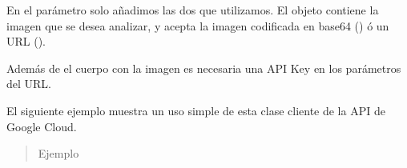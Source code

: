 \begin{fulllineitems}
\begin{fulllineitems}
\begin{sphinxVerbatim}[commandchars=\\\{\}]
   \PYG{p}{[}
       \PYG{p}{[}
           
           
      \PYG{p}{]}
       
         
         
           
  \PYG{p}{]}
\end{sphinxVerbatim}

En el parámetro  solo añadimos las dos que utilizamos. El objeto
 contiene la imagen que se desea analizar, y acepta la imagen codificada
en base64 () ó un URL ().

Además de el cuerpo con la imagen es necesaria una API Key en los parámetros
del URL.

El siguiente ejemplo muestra un uso simple de esta clase cliente de la API
de Google Cloud.
\begin{quote}\begin{description}
\item[{Ejemplo}] \leavevmode
\end{description}\end{quote}


\end{fulllineitems}
\end{fulllineitems}
